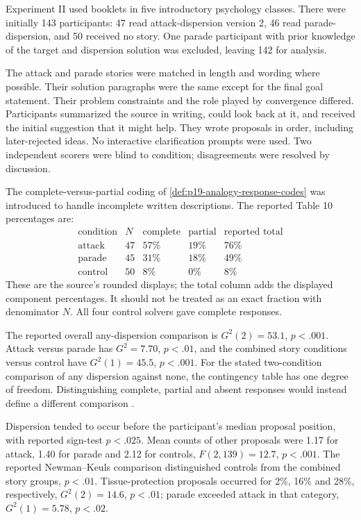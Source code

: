 Experiment II used booklets in five introductory
psychology classes. There were initially 143 participants:
47 read attack-dispersion version 2, 46 read parade-dispersion,
and 50 received no story. One parade participant with
prior knowledge of the target and dispersion solution
was excluded, leaving 142 for analysis.

The attack and parade stories were matched in length
and wording where possible. Their solution paragraphs
were the same except for the final goal statement.
Their problem constraints and the role played by
convergence differed. Participants summarized the
source in writing, could look back at it, and
received the initial suggestion that it might help.
They wrote proposals in order, including later-rejected
ideas. No interactive clarification prompts were used.
Two independent scorers were blind to condition;
disagreements were resolved by discussion.

The complete-versus-partial coding of
\cref{def:p19-analogy-response-codes} was introduced
to handle incomplete written descriptions.
The reported Table 10 percentages are:
\[
\begin{array}{l|r|rrr}
 \text{condition}&N&\text{complete}&\text{partial}&\text{reported total}\\ \hline
 \text{attack}&47&57\%&19\%&76\%\\
 \text{parade}&45&31\%&18\%&49\%\\
 \text{control}&50&8\%&0\%&8\%
\end{array}
\]
These are the source's rounded displays; the total
column adds the displayed component percentages.
It should not be treated as an exact fraction
with denominator \(N\). All four control solvers
gave complete responses.

The reported overall any-dispersion comparison is
\(G^2(2)=53.1\), \(p<.001\). Attack versus parade
has \(G^2=7.70\), \(p<.01\), and the combined story
conditions versus control have \(G^2(1)=45.5\),
\(p<.001\). For the stated two-condition comparison
of any dispersion against none, the contingency
table has one degree of freedom. Distinguishing
complete, partial and absent responses would instead
define a different comparison
\cite[pp.~332--335]{GickHolyoak1980AnalogicalProblemSolving}.

Dispersion tended to occur before the participant's
median proposal position, with reported sign-test
\(p<.025\). Mean counts of other proposals were
1.17 for attack, 1.40 for parade and 2.12 for controls,
\(F(2,139)=12.7\), \(p<.001\). The reported
Newman--Keuls comparison distinguished controls
from the combined story groups, \(p<.01\).
Tissue-protection proposals occurred for 2\%,
16\% and 28\%, respectively,
\(G^2(2)=14.6\), \(p<.01\); parade exceeded
attack in that category, \(G^2(1)=5.78\),
\(p<.02\).

